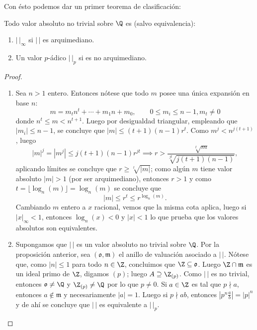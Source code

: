 \documentclass[teoria-numeros.tex]{subfiles}
\begin{document}
Con ésto podemos dar un primer teorema de clasificación:
\begin{thmi}
	Todo valor absoluto no trivial sobre $\Q$ es (salvo equivalencia):
	\begin{enumerate}
		\item $| \, |_\infty$ si $|\,|$ es arquimediano.
		\item Un valor $p$-ádico $|\,|_p$ si es no arquimediano.
	\end{enumerate}
\end{thmi}
\begin{proof}
	\begin{enumerate}
		\item Sea $n > 1$ entero. Entonces nótese que todo $m$ posee una única expansión en base $n$:
			$$ m = m_t n^t + \cdots + m_1n + m_0, \qquad 0\le m_i \le n-1, m_t \ne 0 $$
			donde $n^t \le m < n^{t+1}$.
			Luego por desigualdad triangular, empleando que $|m_i| \le n-1$, se concluye que $|m| \le (t + 1)(n - 1)r^t$.
			Como $m^j < n^{j(t+1)}$, luego
			$$ |m|^j = |m^j| \le j(t + 1)(n-1)r^{jt} \implies r > \frac{\sqrt[t]{m}}{\sqrt[jt]{ j(t+1)(n-1) }}, $$
			aplicando límites se concluye que $r \ge \sqrt[t]{|m|}$; como algún $m$ tiene valor absoluto $|m| > 1$ (por ser arquimediano),
			entonces $r > 1$ y como $t = \lfloor \log_n(m) \rfloor = \log_n(m)$ se concluye que
			$$ |m| \le r^t \le r^{\log_n(m)}. $$
			Cambiando $m$ entero a $x$ racional, vemos que la misma cota aplica, luego si $|x|_\infty < 1$, entonces $\log_n(x) < 0$ y
			$|x| < 1$ lo que prueba que los valores absolutos son equivalentes.

		\item Supongamos que $| \, |$ es un valor absoluto no trivial sobre $\Q$.
			Por la proposición anterior, sea $(\mathfrak{o}, \mathfrak{m})$ el anillo de valuación asociado a $|\,|$.
			Nótese que, como $|n| \le 1$ para todo $n \in \Z$, concluimos que $\Z \subseteq \mathfrak{o}$.
			Luego $\Z \cap \mathfrak{m}$ es un ideal primo de $\Z$, digamos $(p)$; luego $A \supseteq \Z_{(p)}$.
			Como $| \, |$ es no trivial, entonces $\mathfrak{o} \ne \Q$ y $\Z_{(p)} \ne \Q$ por lo que $p \ne 0$.
			Si $a \in \Z$ es tal que $p \nmid a$, entonces $a \notin \mathfrak{m}$ y necesariamente $|a| = 1$.
			Luego si $p \nmid ab$, entonces $| p^n \frac{a}{b} | = |p|^n$ y de ahí se concluye que $| \, |$ es equivalente a $| \, |_p$. \qedhere
	\end{enumerate}
\end{proof}
\end{document}
